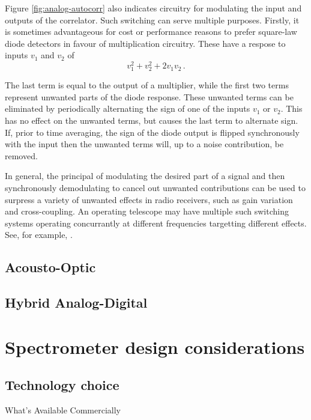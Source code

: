 \documentclass{ws-rv961x669}
\begin{document}
Figure \ref{fig:analog-autocorr} also indicates circuitry for modulating the input and outputs of the correlator. Such switching can serve multiple purposes. Firstly, it is sometimes advantageous for cost or performance reasons to prefer square-law diode detectors in favour of multiplication circuitry. These have a respose to inputs $v_1$ and $v_2$ of
\begin{equation}
 v_1^2 + v_2^2 + 2v_1v_2 \, .
\end{equation}

The last term is equal to the output of a multiplier, while the first two terms represent unwanted parts of the diode response. These unwanted terms can be eliminated by periodically alternating the sign of one of the inputs $v_1$ or $v_2$. This has no effect on the unwanted terms, but causes the last term to alternate sign. If, prior to time averaging, the sign of the diode output is flipped synchronously with the input then the unwanted terms will, up to a noise contribution, be removed.

In general, the principal of modulating the desired part of a signal and then synchronously demodulating to cancel out unwanted contributions can be used to surpress a variety of unwanted effects in radio receivers, such as gain variation and cross-coupling. An operating telescope may have multiple such switching systems operating concurrantly at different frequencies targetting different effects. See, for example, \cite{Erickson2007}. 

\subsection{Acousto-Optic}\label{acousto-optic}

\subsection{Hybrid Analog-Digital}\label{hybrid-analog-digital}




\section{Spectrometer design considerations}

\subsection{Technology choice}
What's Available Commercially
\end{document}
